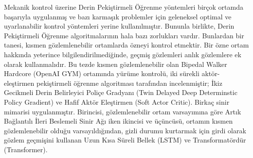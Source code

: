 Mekanik kontrol üzerine Derin Pekiştirmeli Öğrenme yöntemleri birçok ortamda başarıyla uygulanmış ve bazı karmaşık problemler için geleneksel optimal ve uyarlanabilir kontrol yöntemleri yerine kullanılmıştır.
Bununla birlikte, Derin Pekiştirmeli Öğrenme algoritmalarının hala bazı zorlukları vardır.
Bunlardan bir tanesi, kısmen gözlemlenebilir ortamlarda özneyi kontrol etmektir.
Bir özne ortam hakkında yeterince bilgilendirilmediğinde, geçmiş gözlemleri anlık gözlemlere ek olarak kullanmalıdır.
Bu tezde kısmen gözlemlenebilir olan Bipedal Walker Hardcore (OpenAI GYM) ortamında yürüme kontrolü,
iki sürekli aktör-eleştirmen pekiştirmeli öğrenme algoritması tarafından incelenmiştir; İkiz Gecikmeli Derin Belirleyici Poliçe Gradyanı (Twin Delayed Deep Determinstic Policy Gradient) ve Hafif Aktör Eleştirmen (Soft Actor Critic).
Birkaç sinir mimarisi uygulanmıştır.
Birincisi, gözlemlenebilir ortam varsayımına göre Artık Bağlantılı İleri Beslemeli Sinir Ağı iken
ikincisi ve üçüncüsü, ortamın kısmen gözlemlenebilir olduğu varsayıldığından, gizli durumu kurtarmak için girdi olarak gözlem geçmişini kullanan Uzun Kısa Süreli Bellek (LSTM) ve Transformatördür (Transformer).